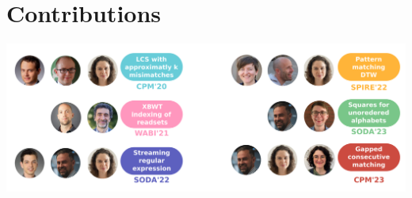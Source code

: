 \documentclass[aspectratio=169, handout]{beamer}
\begin{document}
\section{Contributions}
\begin{frame}[plain]
  \vspace{1cm}

  \includegraphics[width=\textwidth]{pictures/mindmap/co_auth.png}
\end{frame}
\end{document}
